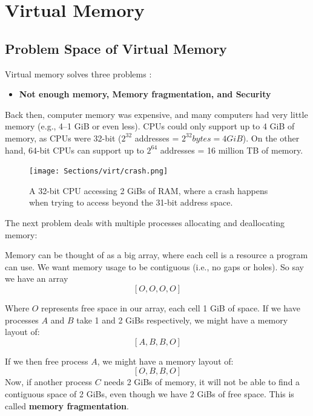\newpage
\section{Virtual Memory}

\label{sec:virt}
\subsection{Problem Space of Virtual Memory}
Virtual memory solves three problems \cite{virtualmemory2023}:
\begin{itemize}
    \item \textbf{Not enough memory, Memory fragmentation, and Security}
\end{itemize}
\begin{Def}

    Back then, computer memory was expensive, and many computers had very little memory (e.g., 4--1 GiB or even less).
    CPUs could only support up to 4 GiB of memory, as CPUs were 32-bit ($2^{32}$ addresses = $2^{32} bytes  = 4 GiB$). 
    On the other hand, 64-bit CPUs can support up to $2^{64}$ addresses = 16 million TB of memory.
\end{Def}

\begin{figure}[h]

    \hspace{-7em}
    \texttt{[image: Sections/virt/crash.png]}
    
    \vspace{1em}
    \caption{A 32-bit CPU accessing 2 GiBs of RAM, where a crash happens when trying to access beyond the 31-bit address space.}
    
    \label{fig:virt1}
\end{figure}
\newpage 

\noindent
The next problem deals with multiple processes allocating and deallocating memory:

\begin{Def}
    
    Memory can be thought of as a big array, where each cell is a resource a program can use.
    We want memory usage to be contiguous (i.e., no gaps or holes). So say we have an array 
    $$[O, O, O, O]$$

    \noindent
    Where $O$ represents free space in our array, each cell 1 GiB of space. If we have processes $A$ and $B$ take 1 and 2 GiBs respectively, we might have a memory layout of:
    $$[A, B, B, O]$$

    \noindent
    If we then free process $A$, we might have a memory layout of:
    $$[O, B, B, O]$$
    \noindent
    Now, if another process $C$ needs 2 GiBs of memory, it will not be able to find a contiguous space of 2 GiBs, even though we have 2 GiBs of free space.
    This is called \textbf{memory fragmentation}.
\end{Def}

